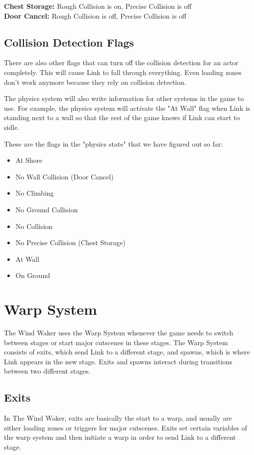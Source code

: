 \documentclass[titlepage,12pt,a4paper]{article}
\let\stdsection\section
\renewcommand\section{\newpage\stdsection}
\begin{document}
\textbf{Chest Storage:} Rough Collision is on, Precise Collision is off\\
\textbf{Door Cancel:} Rough Collision is off, Precise Collision is off

\subsection{Collision Detection Flags}
There are also other flags that can turn off the collision detection for an actor completely. This will cause Link to fall through everything. Even loading zones don’t work anymore because they rely on collision detection.

The physics system will also write information for other systems in the game to use. For example, the physics system will activate the "At Wall" flag when Link is standing next to a wall so that the rest of the game knows if Link can start to sidle.

These are the flags in the "physics state" that we have figured out so far:
\begin{itemize}
	\item At Shore
	\item No Wall Collision (Door Cancel)
	\item No Climbing
	\item No Ground Collision
	\item No Collision
	\item No Precise Collision (Chest Storage)
	\item At Wall
	\item On Ground
\end{itemize}

\section{Warp System}
The Wind Waker uses the Warp System whenever the game needs to switch between stages or start major cutscenes in these stages. The Warp System consists of exits, which send Link to a different stage, and spawns, which is where Link appears in the new stage. Exits and spawns interact during transitions between two different stages.

\subsection{Exits}
In The Wind Waker, exits are basically the start to a warp, and usually are either loading zones or triggers for major cutscenes. Exits set certain variables of the warp system and then initiate a warp in order to send Link to a different stage.
\end{document}
